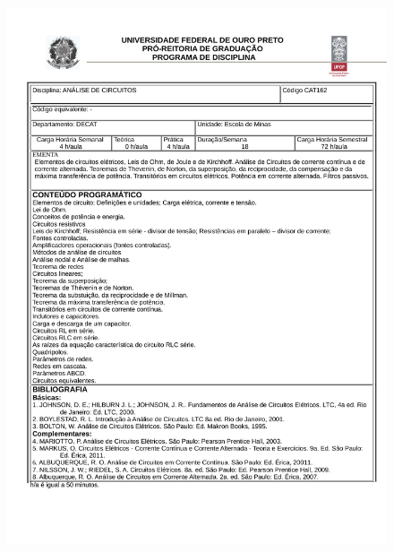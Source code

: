 \begin{figure}[p]
	\centering 
	\includegraphics[scale=0.7]{capitulos/anexo1-programas-disciplina/p42.pdf}
\end{figure}

